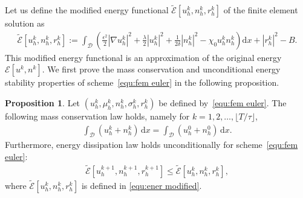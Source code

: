 \documentclass[11pt, reqno]{amsart}
\theoremstyle{definition}
\newtheorem{proposition}[theorem]{Proposition}
\numberwithin{equation}{section}
\newcommand{\dx}{\mathrm{d}x}
\newcommand{\abs}[1]{\left|{#1}\right|}
\begin{document}
Let us define the modified energy functional $\widetilde{\mathcal{E}}[u_h^k,n_h^k,r_h^k]$ of the finite element solution as
\begin{align}\label{equ:ener modified}
	\widetilde{\mathcal{E}}[u_h^k,n_h^k,r_h^k] 
	:=
	\int_\mathscr{D} \left( \frac{\epsilon^2}{2} \abs{\nabla u_h^k}^2 + \frac{\lambda}{2} \abs{u_h^k}^2 + \frac{1}{2\delta} \abs{n_h^k}^2 - \chi_0 u_h^k n_h^k\right) \dx
    + |r_h^k|^2 -B.
\end{align}
This modified energy functional is an approximation of the original energy $\mathcal{E}[u^k,n^k]$.
We first prove the mass conservation and unconditional energy stability properties of scheme~\eqref{equ:fem euler} in the following proposition.

\begin{proposition}
Let $(u_h^k, \mu_h^k, n_h^k, \sigma_h^k, r_h^k)$ be defined by~\eqref{equ:fem euler}. The following mass conservation law holds, namely for $k=1,2,\ldots,\lfloor T/\tau \rfloor$,
\begin{align}\label{equ:mass cons}
	\int_{\mathscr{D}} (u_h^k+n_h^k) \,\dx = \int_{\mathscr{D}} (u_h^0+n_h^0) \,\dx.
\end{align}
Furthermore, energy dissipation law holds unconditionally for scheme~\eqref{equ:fem euler}:
	\begin{align}\label{equ:disc ener ineq}
		\widetilde{\mathcal{E}}[u_h^{k+1}, n_h^{k+1}, r_h^{k+1}] \leq \widetilde{\mathcal{E}}[u_h^k, n_h^k, r_h^k],
	\end{align}
where $\widetilde{\mathcal{E}}[u_h^k, n_h^k, r_h^k]$ is defined in \eqref{equ:ener modified}.
\end{proposition}
\end{document}

